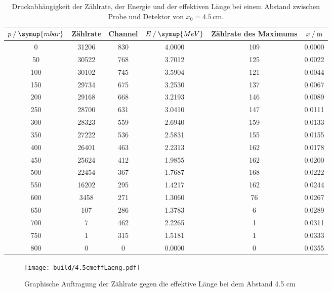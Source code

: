 \begin{table}
  \centering
  \caption{Druckabhängigkeit der Zählrate, der Energie und der effektiven Länge bei einem Abstand zwischen Probe und Detektor von $x_0 = 4.5\,\unit{\cm}$.}
\begin{tabular}{c c c c c c}
  \toprule
  $p \mathbin{/}\symup{mbar}$ &Zählrate& Channel & $E \mathbin{/}\symup{MeV}$ & Zählrate des Maximums & $x \mathbin{/}\unit{\m}$ \\
  \midrule
                    0&31206&830&4.0000&109&0.0000 \\
                    50&30522&768&3.7012&125&0.0022 \\
                   100&30102&745&3.5904&121&0.0044 \\
                   150&29734&675&3.2530&137&0.0067 \\
                   200&29168&668&3.2193&146&0.0089 \\
                   250&28700&631&3.0410&147&0.0111 \\
                   300&28323&559&2.6940&159&0.0133 \\
                   350&27222&536&2.5831&155&0.0155 \\
                   400&26401&463&2.2313&162&0.0178 \\
                   450&25624&412&1.9855&162&0.0200 \\
                   500&22454&367&1.7687&168&0.0222 \\
                   550&16202&295&1.4217&162&0.0244 \\
                     600&3458&271&1.3060&76&0.0267 \\
                       650&107&286&1.3783&6&0.0289 \\
                         700&7&462&2.2265&1&0.0311 \\
                         750&1&315&1.5181&1&0.0333 \\
                           800&0&0&0.0000&0&0.0355 \\
  \bottomrule
  \end{tabular}
  \label{tab:4.5cm}
\end{table}

\begin{figure}
  \centering
  \texttt{[image: build/4.5cmeffLaeng.pdf]}
  \caption{Graphische Auftragung der Zählrate gegen die effektive Länge bei dem Abstand 4.5 $\unit{\cm}$}
  \label{fig:4.5graph}
\end{figure}


